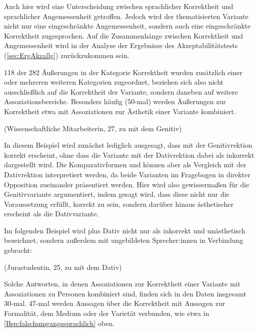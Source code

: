 \begin{sloppypar}
\noindent
Auch hier wird eine Unterscheidung zwischen sprachlicher Korrektheit und sprachlicher Angemessenheit getroffen. 
Jedoch wird der thematisierten Variante nicht nur eine eingeschränkte Angemessenheit, sondern auch eine eingeschränkte Korrektheit zugesprochen. 
Auf die Zusammenhänge zwischen Korrektheit und Angemessenheit wird in der Analyse der Ergebnisse des Akzeptabilitätstests (\autoref{sec:ErgAkzallg}) zurückzukommen sein. 
\end{sloppypar}

118 der 282 Äußerungen in der Kategorie \glqq Korrektheit\grqq{} wurden zusätzlich einer oder mehreren weiteren Kategorien zugeordnet, beziehen sich also nicht ausschließlich auf die Korrektheit der Variante, sondern daneben auf weitere Assoziationsbereiche. 
Besonders häufig (50-mal) werden Äußerungen zur Korrektheit etwa mit Assoziationen zur Ästhetik einer Variante kombiniert. 
\begin{exe}
\ex {} (Wissenschaftliche Mitarbeiterin, 27, zu \dank{} mit dem Genitiv)
\end{exe} 
In diesem Beispiel wird zunächst lediglich ausgesagt, dass \dank{} mit der Genitivrektion korrekt erscheint, ohne dass die Variante mit der Dativrektion dabei als inkorrekt dargestellt wird. 
Die Komparativformen  und  können aber als Vergleich mit der Dativrektion interpretiert werden, da beide Varianten im Fragebogen in direkter Opposition zueinander präsentiert werden. 
Hier wird also gewissermaßen für die Genitivvariante argumentiert, indem gesagt wird, dass diese nicht nur die Voraussetzung erfüllt, korrekt zu sein, sondern darüber hinaus ästhetischer erscheint als die Dativvariante. 

Im folgenden Beispiel wird \waehrend{} plus Dativ nicht nur als inkorrekt und unästhetisch bezeichnet, sondern außerdem mit ungebildeten Sprecher:innen in Verbindung gebracht: 
\begin{exe}
\ex {} (Jurastudentin, 25, zu \waehrend{} mit dem Dativ) \label{Bsp:hohleBirne}
\end{exe}
Solche Antworten, in denen Assoziationen zur Korrektheit einer Variante mit Assoziationen zu Personen kombiniert sind, finden sich in den Daten insgesamt 30-mal. 
47-mal werden Aussagen über die Korrektheit mit Aussagen zur Formalität, dem Medium oder der Varietät verbunden, wie etwa in \autoref{Bsp:falschumgangssprachlich} oben. 

